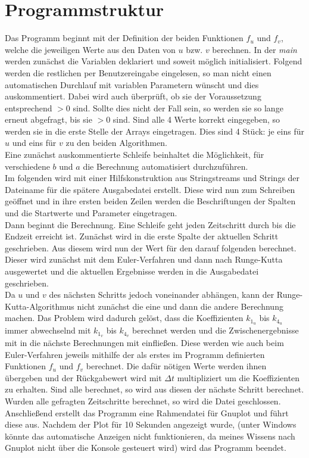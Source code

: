 \documentclass[12pt,a4paper,titlepage,headinclude,bibtotoc]{scrartcl}
\begin{document}
\section{Programmstruktur}
Das Programm beginnt mit der Definition der beiden Funktionen $f_u$ und $f_v$, welche die jeweiligen Werte aus den Daten von $u$ bzw. $v$ berechnen.
In der \emph{main} werden zunächst die Variablen deklariert und soweit möglich initialisiert.
Folgend werden die restlichen per Benutzereingabe eingelesen, so man nicht einen automatischen Durchlauf mit variablen Parametern wünscht und dies auskommentiert.
Dabei wird auch überprüft, ob sie der Voraussetzung entsprechend $>0$ sind.
Sollte dies nicht der Fall sein, so werden sie so lange erneut abgefragt, bis sie $>0$ sind.
Sind alle 4 Werte korrekt eingegeben, so werden sie in die erste Stelle der Arrays eingetragen.
Dies sind 4 Stück: je eins für $u$ und eins für $v$ zu den beiden Algorithmen.\\
Eine zunächst auskommentierte Schleife beinhaltet die Möglichkeit, für verschiedene $b$ und $a$ die Berechnung automatisiert durchzuführen.\\
Im folgenden wird mit einer Hilfskonstruktion aus Stringstreams und Strings der Dateiname für die spätere Ausgabedatei erstellt.
Diese wird nun zum Schreiben geöffnet und in ihre ersten beiden Zeilen werden die Beschriftungen der Spalten und die Startwerte und Parameter eingetragen.\\
Dann beginnt die Berechnung.
Eine Schleife geht jeden Zeitschritt durch bis die Endzeit erreicht ist.
Zunächst wird in die erste Spalte der aktuellen Schritt geschrieben.
Aus diesem wird nun der Wert für den darauf folgenden berechnet.
Dieser wird zunächst mit dem Euler-Verfahren und dann nach Runge-Kutta ausgewertet und die aktuellen Ergebnisse werden in die Ausgabedatei geschrieben.\\
Da $u$ und $v$ des nächsten Schritts jedoch voneinander abhängen, kann der Runge-Kutta-Algorithmus nicht zunächst die eine und dann die andere Berechnung machen.
Das Problem wird dadurch gelöst, dass die Koeffizienten $k_{1_u}$ bis $k_{4_u}$ immer abwechselnd mit $k_{1_v}$ bis $k_{4_v}$ berechnet werden und die Zwischenergebnisse mit in die nächste Berechnungen mit einfließen.
Diese werden wie auch beim Euler-Verfahren jeweils mithilfe der als erstes im Programm definierten Funktionen $f_u$ und $f_v$ berechnet.
Die dafür nötigen Werte werden ihnen übergeben und der Rückgabewert wird mit $\Delta t$ multipliziert um die Koeffizienten zu erhalten.
Sind alle berechnet, so wird aus diesen der nächste Schritt berechnet.
Wurden alle gefragten Zeitschritte berechnet, so wird die Datei geschlossen.\\
Anschließend erstellt das Programm eine Rahmendatei für Gnuplot und führt diese aus.
Nachdem der Plot für 10 Sekunden angezeigt wurde, (unter Windows könnte das automatische Anzeigen nicht funktionieren, da meines Wissens nach Gnuplot nicht über die Konsole gesteuert wird) wird das Programm beendet.
\end{document}
